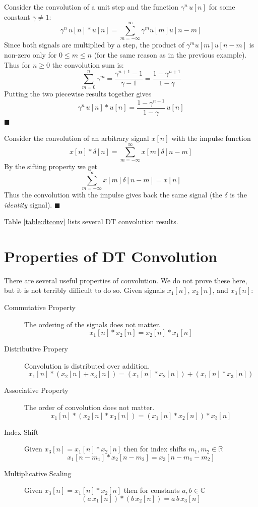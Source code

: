 \begin{example}
Consider the convolution of a unit step and the function $\gamma^n\,u[n]$ for some constant $\gamma \neq 1$:
  \[
  \gamma^n\, u[n] * u[n] = \sum\limits_{m = -\infty}^{\infty} \gamma^{m}u[m]u[n-m]
  \]
  Since both signals are multiplied by a step, the product of $\gamma^{m}u[m]u[n-m]$ is non-zero only for $0 \leq m \leq n$ (for the same reason as in the previous example). Thus for $n \geq 0$ the convolution sum is:
  \[
  \sum\limits_{m = 0}^{n} \gamma^{m} = \frac{\gamma^{n+1}-1}{\gamma-1} = \frac{1-\gamma^{n+1}}{1-\gamma}
  \]
  Putting the two piecewise results together gives
  \[
  \gamma^n\, u[n] * u[n] = \frac{1-\gamma^{n+1}}{1-\gamma}\,u[n]
  \]
  $\blacksquare$
\end{example}
\begin{example} Consider the convolution of an arbitrary signal $x[n]$ with the impulse function
  \[
  x[n] * \delta[n] = \sum\limits_{m = -\infty}^{\infty} x[m]\delta[n-m]
  \]
  By the sifting property we get
  \[
  \sum\limits_{m = -\infty}^{\infty} x[m]\delta[n-m] = x[n]
  \]
  Thus the convolution with the impulse gives back the same signal (the $\delta$ is the \emph{identity} signal). $\blacksquare$
\end{example}

\noindent Table \ref{table:dtconv} lists several DT convolution results.

\section{Properties of DT Convolution}
There are several useful properties of convolution. We do not prove these here, but it is not terribly difficult to do so. Given signals $x_1[n]$, $x_2[n]$, and $x_3[n]$:

\begin{description}
\item [Commutative Property] The ordering of the signals does not matter.
  \[
x_1[n] * x_2[n] = x_2[n] * x_1[n]
  \]
\item [Distributive Propery] Convolution is distributed over addition.
  \[
  x_1[n] * \left(x_2[n] + x_3[n]\right) = \left(x_1[n] * x_2[n] \right) + \left(x_1[n] * x_3[n] \right) 
  \]
\item [Associative Property] The order of convolution does not matter.
    \[
  x_1[n] * \left(x_2[n] * x_3[n]\right) = \left(x_1[n] * x_2[n] \right) * x_3[n] 
  \]
\item [Index Shift] Given $x_3[n] = x_1[n] * x_2[n]$ then for index shifts $m_1, m_2 \in \mathbb{R}$
  \[
  x_1[n-m_1] * x_2[n-m_2] = x_3[n-m_1 - m_2]
  \]
\item [Multiplicative Scaling] Given $x_3[n] = x_1[n] * x_2[n]$ then for constants $a,b \in \mathbb{C}$
  \[
  \left(a\, x_1[n]\right) * \left(b\, x_2[n]\right) = a\, b\, x_3[n]
  \]
\end{description}

